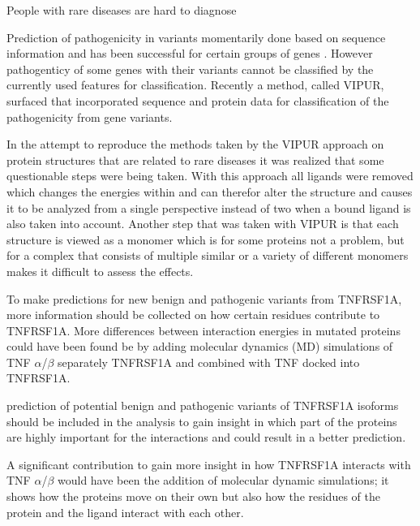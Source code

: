 
People with rare diseases are hard to diagnose

Prediction of pathogenicity in variants momentarily done based on sequence information and has been successful for certain groups of genes \cite{}.
However pathogenticy of some genes with their variants cannot be classified by the currently used features for classification. Recently a method, called VIPUR, surfaced that incorporated sequence and protein data for classification of the pathogenicity from gene variants\cite{}. 

In the attempt to reproduce the methods taken by the VIPUR approach on protein structures that are related to rare diseases it was realized that some questionable steps were being taken. With this approach all ligands were removed \cite{} which changes the energies within and can therefor alter the structure \cite{} and causes it to be analyzed from a single perspective instead of two when a bound ligand is also taken into account. 
Another step that was taken with VIPUR is that each structure is viewed as a monomer which is for some proteins not a problem, but for a complex that consists of multiple similar or a variety of different monomers makes it difficult to assess the effects.

To make predictions for new benign and pathogenic variants from TNFRSF1A, more information should be collected on how certain residues contribute to TNFRSF1A. More differences between interaction energies in mutated proteins could have been found be by adding molecular dynamics (MD) simulations of TNF $\alpha$/$\beta$ separately TNFRSF1A and combined with TNF docked into TNFRSF1A.



 prediction of potential benign and pathogenic variants of TNFRSF1A isoforms should be included in the analysis to gain insight in which part of the proteins are highly important for the interactions and could result in a better prediction.

 A significant contribution to gain more insight in how TNFRSF1A interacts with TNF $\alpha$/$\beta$ would have been the addition of molecular dynamic simulations; it shows how the proteins move on their own but also how the residues of the protein and the ligand interact with each other.

